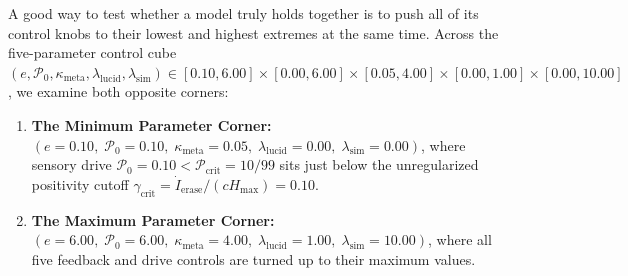 \documentclass[11pt,a4paper]{article}
\theoremstyle{definition}
\begin{document}
A good way to test whether a model truly holds together is to push all of its control knobs to their lowest and highest extremes at the same time. Across the five-parameter control cube $(e, \mathcal{P}_0, \kappa_{\mathrm{meta}}, \lambda_{\mathrm{lucid}}, \lambda_{\mathrm{sim}}) \in [0.10, 6.00] \times [0.00, 6.00] \times [0.05, 4.00] \times [0.00, 1.00] \times [0.00, 10.00]$, we examine both opposite corners:
\begin{enumerate}
  \item \textbf{The Minimum Parameter Corner:} $(e=0.10,\; \mathcal{P}_0=0.10,\; \kappa_{\mathrm{meta}}=0.05,\; \lambda_{\mathrm{lucid}}=0.00,\; \lambda_{\mathrm{sim}}=0.00)$, where sensory drive $\mathcal{P}_0 = 0.10 < \mathcal{P}_{\mathrm{crit}} = 10/99$ sits just below the unregularized positivity cutoff $\gamma_{\mathrm{crit}} = \dot{I}_{\mathrm{erase}}/(c H_{\max}) = 0.10$.
  \item \textbf{The Maximum Parameter Corner:} $(e=6.00,\; \mathcal{P}_0=6.00,\; \kappa_{\mathrm{meta}}=4.00,\; \lambda_{\mathrm{lucid}}=1.00,\; \lambda_{\mathrm{sim}}=10.00)$, where all five feedback and drive controls are turned up to their maximum values.
\end{enumerate}
\end{document}
